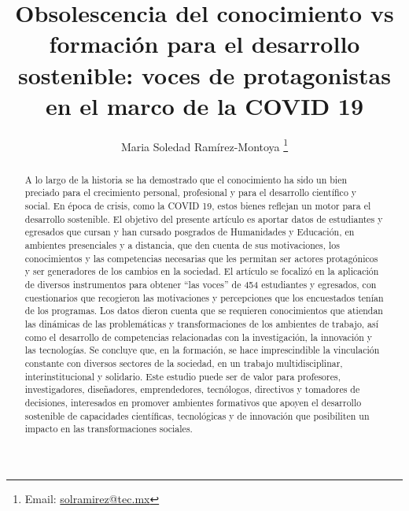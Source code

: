 \documentclass{textolivre}
\title{Obsolescencia del conocimiento vs formación para el desarrollo sostenible: voces de protagonistas en el marco de la COVID 19}
\author[1]{Maria Soledad Ramírez-Montoya \orcid{0000-0002-1274-706X} \thanks{Email: \url{solramirez@tec.mx}}}
\affil[1]{Tecnologico de Monterrey, Escuela de Humanidades y Educación, Departamento de Educación, Monterrey, México.}
\begin{document}
\maketitle

\begin{polyabstract}
\begin{abstract}
A lo largo de la historia se ha demostrado que el conocimiento ha sido un bien preciado para el crecimiento personal, profesional y para el desarrollo científico y social. En época de crisis, como la COVID 19, estos bienes reflejan un motor para el desarrollo sostenible. El objetivo del presente artículo es aportar datos de estudiantes y egresados que cursan y han cursado posgrados de Humanidades y Educación, en ambientes presenciales y a distancia, que den cuenta de sus motivaciones, los conocimientos y las competencias necesarias que les permitan ser actores protagónicos y ser generadores de los cambios en la sociedad. El artículo se focalizó en la aplicación de diversos instrumentos para obtener “las voces” de 454 estudiantes y egresados, con cuestionarios que recogieron las motivaciones y percepciones que los encuestados tenían de los programas. Los datos dieron cuenta que se requieren conocimientos que atiendan las dinámicas de las problemáticas y transformaciones de los ambientes de trabajo, así como el desarrollo de competencias relacionadas con la investigación, la innovación y las tecnologías. Se concluye que, en la formación, se hace imprescindible la vinculación constante con diversos sectores de la sociedad, en un trabajo multidisciplinar, interinstitucional y solidario. Este estudio puede ser de valor para profesores, investigadores, diseñadores, emprendedores, tecnólogos, directivos y tomadores de decisiones, interesados en promover ambientes formativos que apoyen el desarrollo sostenible de capacidades científicas, tecnológicas y de innovación que posibiliten un impacto en las transformaciones sociales.

\end{abstract}


\end{polyabstract}
\end{document}
